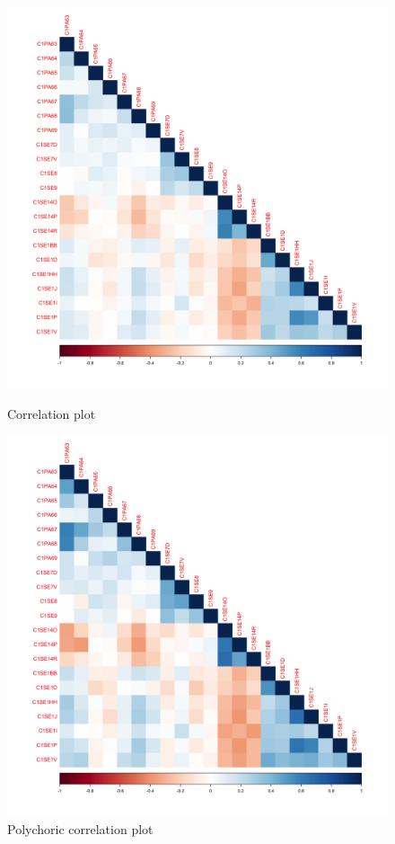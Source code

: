 \documentclass[11pt]{article}
\begin{document}
\begin{figure}[h!]
\centering
  \begin{minipage}{0.49\linewidth}
  \includegraphics[width=\linewidth]{../visualizations/corr.png}
  \caption{Correlation plot}
  \label{fig:corr}
  \end{minipage}
  \hfill
  \begin{minipage}{0.49\linewidth}
  \includegraphics[width=\linewidth]{../visualizations/corr_poly.png}
  \caption{Polychoric correlation plot}
  \label{fig:poly_corr}
  \end{minipage}
\end{figure}
\end{document}
